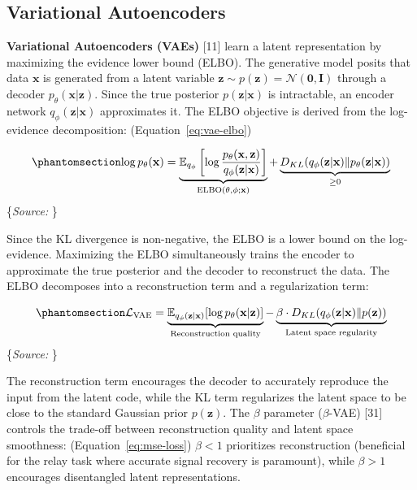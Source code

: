 \documentclass[
  english,
  12pt,
  12pt,
  a4paper,
  oneside]{report}
\begin{document}
\subsection{Variational Autoencoders}\label{sec:variational-autoencoders}

\textbf{Variational Autoencoders (VAEs)} {[}11{]} learn a latent representation by maximizing the evidence lower bound (ELBO). The generative model posits that data \(\mathbf{x}\) is generated from a latent variable \(\mathbf{z} \sim p(\mathbf{z}) = \mathcal{N}(\mathbf{0}, \mathbf{I})\) through a decoder \(p_\theta(\mathbf{x} | \mathbf{z})\). Since the true posterior \(p(\mathbf{z} | \mathbf{x})\) is intractable, an encoder network \(q_\phi(\mathbf{z} | \mathbf{x})\) approximates it. The ELBO objective is derived from the log-evidence decomposition: (Equation~\ref{eq:vae-elbo})

\begin{equation}\protect\phantomsection\label{eq:vae-elbo}{\log p_\theta(\mathbf{x}) = \underbrace{\mathbb{E}_{q_\phi}\left[\log \frac{p_\theta(\mathbf{x}, \mathbf{z})}{q_\phi(\mathbf{z} | \mathbf{x})}\right]}_{\text{ELBO}(\theta, \phi; \mathbf{x})} + \underbrace{D_{KL}(q_\phi(\mathbf{z} | \mathbf{x}) \| p_\theta(\mathbf{z} | \mathbf{x}))}_{\geq 0}
}\end{equation} \footnotesize\{\textit{Source: \1}\}\normalsize

Since the KL divergence is non-negative, the ELBO is a lower bound on the log-evidence. Maximizing the ELBO simultaneously trains the encoder to approximate the true posterior and the decoder to reconstruct the data. The ELBO decomposes into a reconstruction term and a regularization term:

\begin{equation}\protect\phantomsection\label{eq:vae-loss}{\mathcal{L}_{\text{VAE}} = \underbrace{\mathbb{E}_{q_\phi(\mathbf{z}|\mathbf{x})}[\log p_\theta(\mathbf{x}|\mathbf{z})]}_{\text{Reconstruction quality}} - \underbrace{\beta \cdot D_{KL}(q_\phi(\mathbf{z}|\mathbf{x}) \| p(\mathbf{z}))}_{\text{Latent space regularity}}
}\end{equation} \footnotesize\{\textit{Source: \1}\}\normalsize

The reconstruction term encourages the decoder to accurately reproduce the input from the latent code, while the KL term regularizes the latent space to be close to the standard Gaussian prior \(p(\mathbf{z})\). The \(\beta\) parameter (\(\beta\)-VAE) {[}31{]} controls the trade-off between reconstruction quality and latent space smoothness: (Equation~\ref{eq:mse-loss}) \(\beta < 1\) prioritizes reconstruction (beneficial for the relay task where accurate signal recovery is paramount), while \(\beta > 1\) encourages disentangled latent representations.
\end{document}
